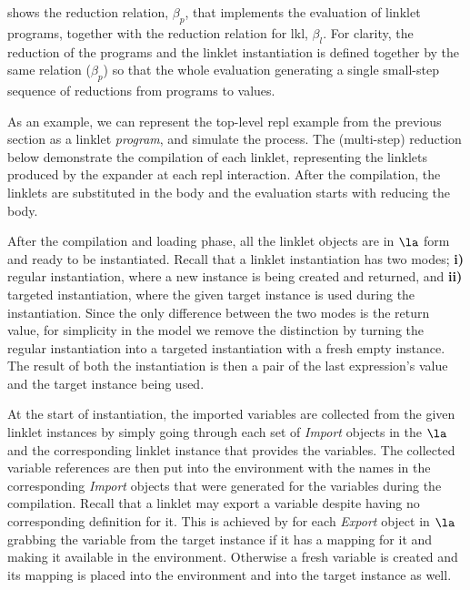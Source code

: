 
		\begin{paragraph-here}%
			 shows the reduction relation, $\beta_p$, that implements the evaluation of linklet programs, together with the reduction relation for
			\gls{lkl}, $\beta_l$. For clarity, the reduction of the programs and the linklet
			instantiation is defined together by the same relation ($\beta_p$) so that
			the whole evaluation generating a single small-step sequence of
			reductions from programs to values.
		\end{paragraph-here}


		\begin{paragraph-here}
			As an example, we can represent the top-level repl example from the
			previous section as a linklet \emph{program}, and simulate the
			process. The (multi-step) reduction below demonstrate the compilation of each
			linklet, representing the linklets produced by the expander at each
			repl interaction. After the compilation, the linklets are substituted
			in the body and the evaluation starts with reducing the
			body.
		\end{paragraph-here}


		\begin{paragraph-here}
			After the compilation and loading phase, all the linklet objects are
			in $\la$ form and ready to be instantiated. Recall that a linklet
			instantiation has two modes; \textbf{i)} regular instantiation, where
			a new instance is being created and returned, and \textbf{ii)}
			targeted instantiation, where the given target instance is used during
			the instantiation. Since the only difference between the two modes is
			the return value, for simplicity in the model we remove the
			distinction by turning the regular instantiation into a targeted
			instantiation with a fresh empty instance. The result of both the
			instantiation is then a pair of the last expression's value and the
			target instance being used.
		\end{paragraph-here}

		\begin{paragraph-here}
			At the start of instantiation, the imported variables are collected
			from the given linklet instances by simply going through each set of
			\emph{Import} objects in the $\la$ and the corresponding linklet
			instance that provides the variables. The collected variable
			references are then put into the environment with the names in the
			corresponding \emph{Import} objects that were generated for the
			variables during the compilation. Recall that a linklet may export a
			variable despite having no corresponding definition for it. This is
			achieved by for each \emph{Export} object in $\la$ grabbing the
			variable from the target instance if it has a mapping for it and
			making it available in the environment. Otherwise a fresh variable is
			created and its mapping is placed into the environment and into the
			target instance as well.
		\end{paragraph-here}

